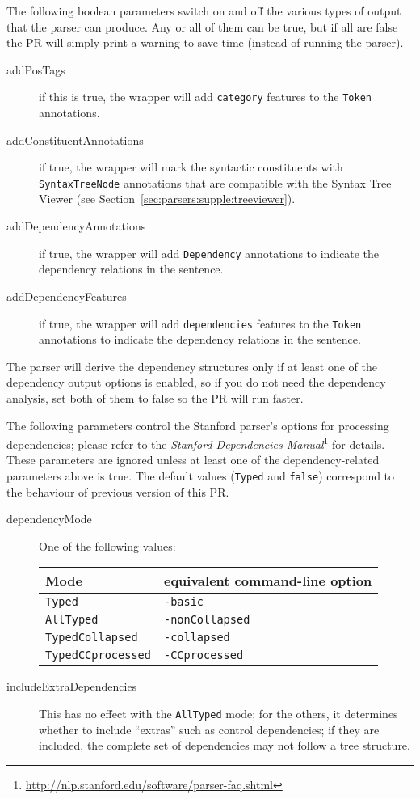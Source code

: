 The following boolean parameters switch on and off the various types
of output that the parser can produce.  Any or all of them can be
true, but if all are false the PR will simply print a warning to save
time (instead of running the parser).
%
\begin{description}
%
\item[addPosTags] if this is true, the wrapper will add
  \texttt{category} features to the \texttt{Token} annotations.
%
\item[addConstituentAnnotations] if true, the wrapper will mark the
  syntactic constituents with \texttt{SyntaxTreeNode} annotations that
  are compatible with the Syntax Tree Viewer (see
  Section~\ref{sec:parsers:supple:treeviewer}).
%
\item[addDependencyAnnotations] if true, the wrapper will add
  \texttt{Dependency} annotations to indicate the dependency relations
  in the sentence.
%
\item[addDependencyFeatures] if true, the wrapper will add
  \texttt{dependencies} features to the \texttt{Token} annotations to 
  indicate the dependency relations in the sentence.
%
\end{description}
%
The parser will derive the dependency structures only if at least one of the
dependency output options is enabled, so if you do not need the dependency
analysis, set both of them to false so the PR will run faster.



The following parameters control the Stanford parser's options for processing
dependencies; please refer to the \emph{Stanford Dependencies
  Manual}\footnote{\url{http://nlp.stanford.edu/software/parser-faq.shtml}} for
details.  These parameters are ignored unless at least one of the
dependency-related parameters above is true.  The default values (\texttt{Typed}
and \texttt{false}) correspond to the behaviour of previous version of this PR.
\begin{description}
%
\item[dependencyMode] One of the following values:
%
  \begin{tabular}{ll}
    Mode & equivalent command-line option\\
    \hline
    \texttt{Typed} & \texttt{-basic}\\
    \texttt{AllTyped} & \texttt{-nonCollapsed}\\
    \texttt{TypedCollapsed} & \texttt{-collapsed}\\
    \texttt{TypedCCprocessed} & \texttt{-CCprocessed}    
  \end{tabular}
%
\item[includeExtraDependencies] This has no effect with the \texttt{AllTyped}
  mode; for the others, it determines whether to include ``extras'' such as
  control dependencies; if they are included, the complete set of dependencies
  may not follow a tree structure.
%
\end{description}



